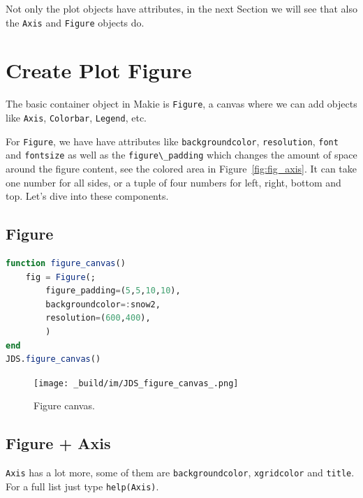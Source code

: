 \documentclass[
  notoc %
]{tufte-book}
\newcommand{\passthrough}[1]{#1}
\begin{document}
Not only the plot objects have attributes, in the next Section we will
see that also the \passthrough{\lstinline!Axis!} and
\passthrough{\lstinline!Figure!} objects do.

\hypertarget{sec:datavisMakie_create_Figure}{%
\section{Create Plot Figure}\label{sec:datavisMakie_create_Figure}}

The basic container object in Makie is \passthrough{\lstinline!Figure!},
a canvas where we can add objects like \passthrough{\lstinline!Axis!},
\passthrough{\lstinline!Colorbar!}, \passthrough{\lstinline!Legend!},
etc.

For \passthrough{\lstinline!Figure!}, we have have attributes like
\passthrough{\lstinline!backgroundcolor!},
\passthrough{\lstinline!resolution!}, \passthrough{\lstinline!font!} and
\passthrough{\lstinline!fontsize!} as well as the
\passthrough{\lstinline!figure\_padding!} which changes the amount of
space around the figure content, see the colored area in
Figure~\ref{fig:fig_axis}. It can take one number for all sides, or a
tuple of four numbers for left, right, bottom and top. Let's dive into
these components.

\hypertarget{figure}{%
\subsection{Figure}\label{figure}}

\begin{lstlisting}[language=Julia]
function figure_canvas()
    fig = Figure(;
        figure_padding=(5,5,10,10),
        backgroundcolor=:snow2,
        resolution=(600,400),
        )
end
JDS.figure_canvas()
\end{lstlisting}

\begin{figure}
\hypertarget{fig:fig}{%
\centering
\texttt{[image: \_build/im/JDS\_figure\_canvas\_.png]}
\caption{Figure canvas.}\label{fig:fig}
}
\end{figure}

\hypertarget{figure-axis}{%
\subsection{Figure + Axis}\label{figure-axis}}

\passthrough{\lstinline!Axis!} has a lot more, some of them are
\passthrough{\lstinline!backgroundcolor!},
\passthrough{\lstinline!xgridcolor!} and
\passthrough{\lstinline!title!}. For a full list just type
\passthrough{\lstinline!help(Axis)!}.
\end{document}
